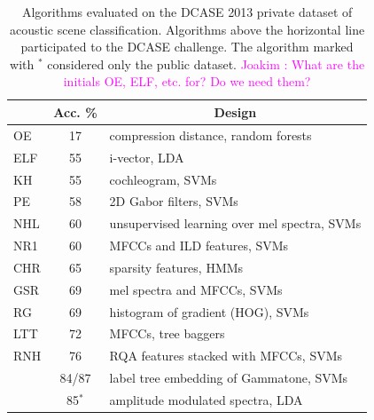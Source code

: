 \documentclass[journal]{IEEEtran}
\newcommand{\gl}[1]{\textcolor{red}{Gr\'egoire : #1}}
\newcommand{\ja}[1]{\textcolor{magenta}{Joakim : #1}}
\begin{document}
\begin{table}
\begin{center}
\caption{Algorithms evaluated on the DCASE 2013 private dataset of acoustic scene classification. Algorithms above the horizontal line participated to the DCASE challenge. The algorithm marked with $^*$ considered only the public dataset. \label{tab:dcase} \ja{What are the initials OE, ELF, etc. for? Do we need them?}}
\begin{tabular}{lcl}
& Acc. \%  &  \multicolumn{1}{c}{Design}  \\
\hline
\cite{olivetti2013wonder} OE & 17 & compression distance, random forests \\
\cite{elizalde2013vector} ELF & 55 & i-vector, LDA \\
\cite{krijnders2013tone} KH & 55 & cochleogram, SVMs \\
\cite{patil2013multiresolution} PE & 58 & 2D Gabor filters, SVMs \\
\cite{lee2013acoustic} NHL & 60 & unsupervised learning over mel spectra, SVMs \\
\cite{nogueira2013sound} NR1 & 60 & MFCCs and ILD features, SVMs \\
\cite{chum2013ieee} CHR & 65 & sparsity features, HMMs  \\
\cite{geiger2013large} GSR & 69 & mel spectra and MFCCs, SVMs \\
\cite{rakotomamonjy2015histogram} RG & 69 & histogram of gradient (HOG), SVMs \\
\cite{li2013auditory} LTT & 72 & MFCCs, tree baggers \\
\cite{roma2013} RNH & 76 & RQA features stacked with MFCCs, SVMs \\
\hline
\cite{phan2016label} & 84/87 & label tree embedding of Gammatone, SVMs \\
\cite{7362846} & 85$^*$ & amplitude modulated spectra, LDA \\
\end{tabular}
\end{center}
\end{table}


\end{document}

